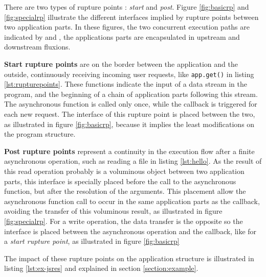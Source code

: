 There are two types of rupture points : \textit{start} and \textit{post}.
Figure \ref{fig:basicrp} and \ref{fig:specialrp} illustrate the different interfaces implied by rupture points between two application parts.
In these figures, the two concurrent execution paths are indicated by  and , the applications parts are encapsulated in upstream and downstream fluxions.

\textbf{Start rupture points} are on the border between the application and the outside, continuously receiving incoming user requests, like \texttt{app.get()} in listing \ref{lst:rupturepoints}.
These functions indicate the input of a data stream in the program, and the beginning of a chain of application parts following this stream.
The asynchronous function is called only once, while the callback is triggered for each new request.
The interface of this rupture point is placed between the two, as illustrated in figure \ref{fig:basicrp}, because it implies the least modifications on the program structure.

\textbf{Post rupture points} represent a continuity in the execution flow after a finite asynchronous operation, such as reading a file in listing \ref{lst:hello}.
As the result of this read operation probably is a voluminous object between two application parts, this interface is specially placed before the call to the asynchronous function, but after the resolution of the arguments.
This placement allow the asynchronous function call to occur in the same application parts as the callback, avoiding the transfer of this voluminous result, as illustrated in figure \ref{fig:specialrp}.
For a write operation, the data transfer is the opposite so the interface is placed between the asynchronous operation and the callback, like for a \textit{start rupture point}, as illustrated in figure \ref{fig:basicrp}

The impact of these rupture points on the application structure is illustrated in listing \ref{lst:ex-jsres} and explained in section \ref{section:example}.

